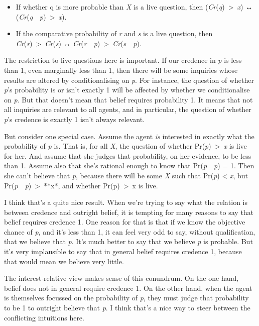\documentclass[
  11pt,
  letterpaper,
  DIV=11,
  numbers=noendperiod,
  twoside]{scrartcl}
\providecommand{\tightlist}{%
  \setlength{\itemsep}{0pt}\setlength{\parskip}{0pt}}
\begin{document}
\begin{itemize}
\tightlist
\item
  If whether q is more probable than \emph{X} is a live question, then
  (\emph{Cr}(\emph{q})~\textgreater~\emph{x}) ↔
  (\emph{Cr}(\emph{q}~\textbar~\emph{p})~\textgreater~\emph{x}).
\item
  If the comparative probability of \emph{r} and \emph{s} is a live
  question, then \emph{Cr}(\emph{r})~\textgreater~\emph{Cr}(\emph{s}) ↔
  \emph{Cr}(\emph{r}~\textbar~\emph{p})~\textgreater~\emph{Cr}(\emph{s}~\textbar~\emph{p}).
\end{itemize}

The restriction to live questions here is important. If our credence in
\emph{p} is less than 1, even marginally less than 1, then there will be
some inquiries whose results are altered by conditionalising on
\emph{p}. For instance, the question of whether \emph{p}'s probability
is or isn't exactly 1 will be affected by whether we conditionalise on
\emph{p}. But that doesn't mean that belief requires probability 1. It
means that not all inquiries are relevant to all agents, and in
particular, the question of whether \emph{p}'s credence is exactly 1
isn't always relevant.

But consider one special case. Assume the agent \emph{is} interested in
exactly what the probability of \emph{p} is. That is, for all \emph{X},
the question of whether Pr(\emph{p})~\textgreater~\emph{x} is live for
her. And assume that she judges that probability, on her evidence, to be
less than 1. Assume also that she's rational enough to know that
Pr(\emph{p}~\textbar~\emph{p}) = 1. Then she can't believe that
\emph{p}, because there will be some \emph{X} such that Pr(\emph{p})
\textless{} \emph{x}, but
Pr(\emph{p}~\textbar~\emph{p})~\textgreater~**x*, and whether
Pr(p)~\textgreater~x is live.

I think that's a quite nice result. When we're trying to say what the
relation is between credence and outright belief, it is tempting for
many reasons to say that belief requires credence 1. One reason for that
is that if we know the objective chance of \emph{p}, and it's less than
1, it can feel very odd to say, without qualification, that we believe
that \emph{p}. It's much better to say that we believe \emph{p} is
probable. But it's very implausible to say that in general belief
requires credence 1, because that would mean we believe very little.

The interest-relative view makes sense of this conundrum. On the one
hand, belief does not in general require credence 1. On the other hand,
when the agent is themselves focussed on the probability of \emph{p},
they must judge that probability to be 1 to outright believe that
\emph{p}. I think that's a nice way to steer between the conflicting
intuitions here.
\end{document}
